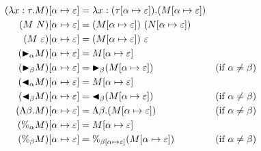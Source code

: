 \begin{align*}
	(\lambda x:\tau.M)[\alpha \mapsto \varepsilon] & = \lambda x:(\tau[\alpha \mapsto \varepsilon]).(M[\alpha \mapsto \varepsilon])                                  \\
	(M\ N)[\alpha \mapsto \varepsilon]             & = (M[\alpha \mapsto \varepsilon])\ (N[\alpha \mapsto \varepsilon])                                          \\
	(M\ \varepsilon)[\alpha \mapsto \varepsilon]      & = (M[\alpha \mapsto \varepsilon])\ \varepsilon                                                                \\
	({\mathop{\blacktriangleright}}_\alpha M)[\alpha \mapsto \varepsilon]      & = M[\alpha \mapsto \varepsilon]                                                                          \\
	({\mathop{\blacktriangleright}}_\beta M)[\alpha \mapsto \varepsilon]      & = {\mathop{\blacktriangleright}}_\beta (M[\alpha \mapsto \varepsilon])                               & (\text{if } \alpha \neq \beta) \\
	({\mathop{\blacktriangleleft}}_\alpha M)[\alpha \mapsto \varepsilon]     & =  M[\alpha \mapsto \varepsilon]                                        &                               \\
	({\mathop{\blacktriangleleft}}_\beta M)[\alpha \mapsto \varepsilon]     & = {\mathop{\blacktriangleleft}}_\beta (M[\alpha \mapsto \varepsilon])                              & (\text{if } \alpha \neq \beta) \\
	(\Lambda\beta.M)[\alpha \mapsto \varepsilon]   & = \Lambda\beta.(M[\alpha \mapsto \varepsilon])                            & (\text{if } \alpha \neq \beta) \\
	(\%_\alpha M)[\alpha \mapsto \varepsilon]       & = M[\alpha \mapsto \varepsilon]                                         &                                  \\
	(\%_\beta M)[\alpha \mapsto \varepsilon]       & = \%_{\beta[\alpha \mapsto \varepsilon]}(M[\alpha \mapsto \varepsilon])      & (\text{if } \alpha \neq \beta) \\
\end{align*}

